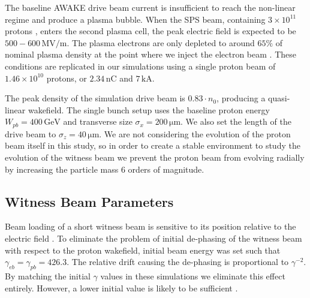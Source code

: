 \documentclass[aps,prstab,reprint,amsmath,amssymb,groupedaddress]{revtex4-1}
\newcommand{\unit}[1]{\,\mathrm{#1}}
\newcommand{\funit}[2]{\,\mathrm{#1}/\mathrm{#2}}
\newcommand{\nexp}[1]{\times 10^{#1}}
\begin{document}

The baseline AWAKE drive beam current is insufficient to reach the non-linear regime and produce a plasma bubble. When
the SPS beam, containing $3\nexp{11}$ protons \cite{gschwendtner:2016}, enters the second plasma cell, the peak electric
field is expected to be $500-600\funit{MV}{m}$. The plasma electrons are only depleted to around $65\%$ of nominal
plasma density at the point where we inject the electron beam \cite{awake_collaboration:2016}. These conditions are
replicated in our simulations using a single proton beam of $1.46\nexp{10}$ protons, or $2.34\unit{nC}$ and
$7\unit{kA}$.

The peak density of the simulation drive beam is $0.83\cdot n_{0}$, producing a quasi-linear wakefield. The single bunch
setup uses the baseline proton energy $W_{pb} = 400\unit{GeV}$ and transverse size $\sigma_{x} = 200\unit{\mu m}$. We
also set the length of the drive beam to $\sigma_{z} = 40\unit{\mu m}$. We are not considering the evolution of the
proton beam itself in this study, so in order to create a stable environment to study the evolution of the witness beam
we prevent the proton beam from evolving radially by increasing the particle mass 6 orders of magnitude.

\subsection{Witness Beam Parameters}\label{S:M:Setup}

Beam loading of a short witness beam is sensitive to its position relative to the electric field \cite{tzoufras:2009}.
To eliminate the problem of initial de-phasing of the witness beam with respect to the proton wakefield, initial beam
energy was set such that $\gamma_{eb} = \gamma_{pb} = 426.3$. The relative drift causing the de-phasing is proportional
to $\gamma^{-2}$. By matching the initial $\gamma$ values in these simulations we eliminate this effect entirely.
However, a lower initial value is likely to be sufficient \cite{berglyd_olsen:2015}.
\end{document}
